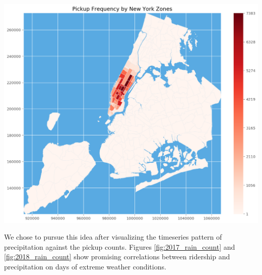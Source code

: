 \documentclass[journal]{IEEEtran}
\begin{document}
\begingroup
    \centering
    \includegraphics[width=\columnwidth]{images/heatmap.png}
    \label{fig:heatmap}
    \medskip
\endgroup

\noindent We chose to pursue this idea after visualizing the timeseries pattern of precipitation against the pickup counts. Figures \ref{fig:2017_rain_count} and \ref{fig:2018_rain_count} show promising correlations between ridership and precipitation on days of extreme weather conditions.
\end{document}
